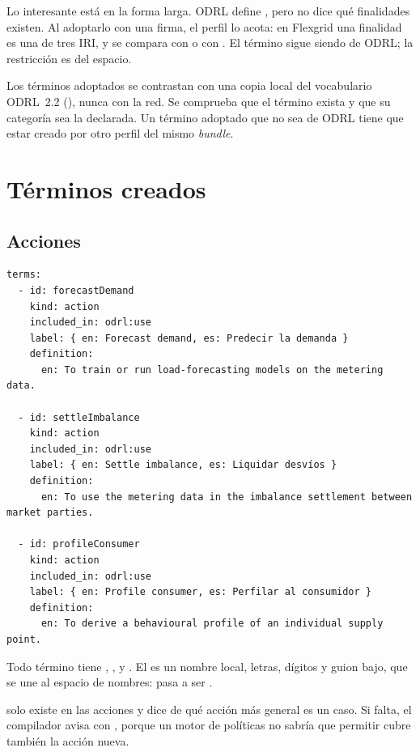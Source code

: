 Lo interesante está en la forma larga. ODRL define , pero no dice qué finalidades existen. Al
adoptarlo con una firma, el perfil lo acota: en Flexgrid una finalidad es una de tres IRI, y se compara con
 o con . El término sigue siendo de ODRL; la restricción es del espacio.

\begin{bajoElCapo}
Los términos  adoptados se contrastan con una copia local del vocabulario ODRL~2.2
(), nunca con la red. Se comprueba que el término exista y que su categoría sea la
declarada. Un término adoptado que no sea de ODRL tiene que estar creado por otro perfil del mismo \emph{bundle}.
\end{bajoElCapo}

\section{Términos creados}

\subsection{Acciones}

\begin{lstlisting}[style=yaml, firstnumber=34]
terms:
  - id: forecastDemand
    kind: action
    included_in: odrl:use
    label: { en: Forecast demand, es: Predecir la demanda }
    definition:
      en: To train or run load-forecasting models on the metering data.

  - id: settleImbalance
    kind: action
    included_in: odrl:use
    label: { en: Settle imbalance, es: Liquidar desvíos }
    definition:
      en: To use the metering data in the imbalance settlement between market parties.

  - id: profileConsumer
    kind: action
    included_in: odrl:use
    label: { en: Profile consumer, es: Perfilar al consumidor }
    definition:
      en: To derive a behavioural profile of an individual supply point.
\end{lstlisting}

Todo término tiene , ,  y . El  es un nombre local, letras,
dígitos y guion bajo, que se une al espacio de nombres:  pasa a ser
.

 solo existe en las acciones y dice de qué acción más general es un caso. Si falta, el
compilador avisa con , porque un motor de políticas no sabría que permitir
 cubre también la acción nueva.

